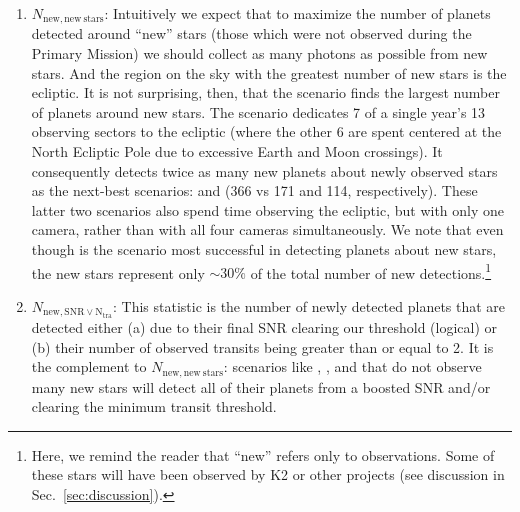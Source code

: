 \begin{enumerate}
	
	\item $N_\mathrm{new,new\ stars}$:
	  Intuitively we expect that to maximize the number of planets detected 
	  around ``new'' stars (those which were not observed during the Primary 
	  Mission) we should collect as many photons as possible from new stars.
         And the region on the sky with the greatest number of new stars is the ecliptic.
	 It is not surprising, then, that the \elong\:scenario finds the largest number of planets around new stars.
         The \elong\:scenario dedicates 7 of a single year's 13 observing sectors to the ecliptic (where the other 6 are spent centered at the North Ecliptic Pole due to excessive Earth and Moon crossings).
	It consequently detects twice as many new planets about newly observed 
	stars as the next-best scenarios: \eshort\:and \shemiAvoid\:(366 vs 171 and 
	114, respectively).
	These latter two scenarios also spend time observing the ecliptic, but with 
	only one camera, rather than with all four cameras simultaneously.
	We note that even though \elong\:is the scenario most successful in 
	detecting planets about new stars, the new stars represent only 
	$\sim\!30\%$ of the total number of new detections.\footnote{Here, we 
	remind the reader that ``new'' refers only to \tess observations. Some of 
	these stars will
          have been observed by K2 or other projects (see discussion in Sec.~\ref{sec:discussion}).}

	\item $N_\mathrm{new,SNR\lor N_{tra}}$:
	This statistic is the number of newly detected planets that are detected either (a) due to their final SNR clearing our threshold (logical) or (b) their number of observed transits being greater than or equal to 2.
	It is the complement to $N_\mathrm{new,new\ stars}$: scenarios like \nhemi, \npole, and \hemis\:that do not observe many new stars will detect all of their planets from a boosted SNR and/or clearing the minimum transit threshold.
	
\end{enumerate}

